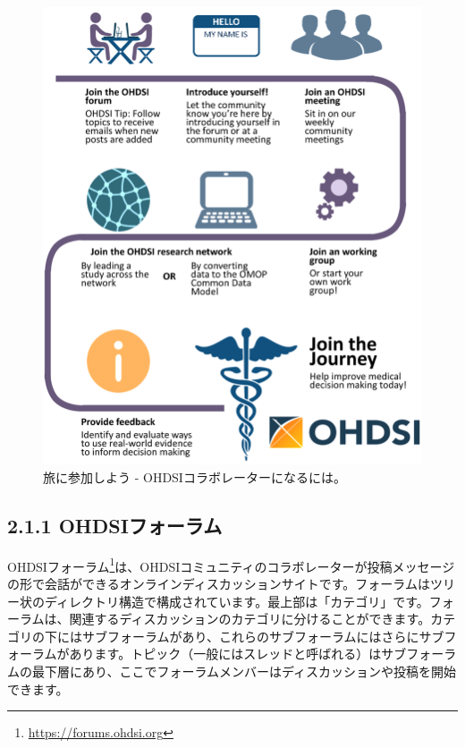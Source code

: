 \documentclass[
  11pt]{book}
\theoremstyle{definition}
\theoremstyle{definition}
\theoremstyle{definition}
\theoremstyle{definition}
\theoremstyle{remark}
\begin{document}
  

\begin{figure}

{\centering \includegraphics[width=0.9\linewidth]{images/WhereToBegin/joinTheJourney} 

}

\caption{旅に参加しよう - OHDSIコラボレーターになるには。}\label{fig:jointhejourney}
\end{figure}

\subsection{2.1.1 OHDSIフォーラム}\label{ohdsiux30d5ux30a9ux30fcux30e9ux30e0}

OHDSIフォーラム\footnote{\url{https://forums.ohdsi.org}}は、OHDSIコミュニティのコラボレーターが投稿メッセージの形で会話ができるオンラインディスカッションサイトです。フォーラムはツリー状のディレクトリ構造で構成されています。最上部は「カテゴリ」です。フォーラムは、関連するディスカッションのカテゴリに分けることができます。カテゴリの下にはサブフォーラムがあり、これらのサブフォーラムにはさらにサブフォーラムがあります。トピック（一般にはスレッドと呼ばれる）はサブフォーラムの最下層にあり、ここでフォーラムメンバーはディスカッションや投稿を開始できます。
\end{document}
